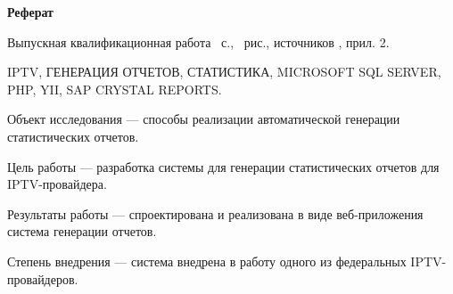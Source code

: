 \begin{center}
	\textbf{Реферат}
\end{center}

Выпускная квалификационная работа ~с., ~рис., источников , прил. 2.

IPTV, ГЕНЕРАЦИЯ ОТЧЕТОВ, СТАТИСТИКА, MICROSOFT SQL SERVER, PHP, YII, SAP CRYSTAL REPORTS.

Объект исследования --- способы реализации автоматической генерации статистических отчетов.

Цель работы --- разработка системы для генерации статистических отчетов для IPTV-провайдера.

Результаты работы --- спроектирована и реализована в виде веб-приложения система генерации отчетов.

Степень внедрения --- система внедрена в работу одного из федеральных IPTV-провайдеров.
